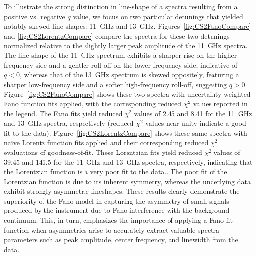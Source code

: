 To illustrate the strong distinction in line-shape of a spectra resulting from a positive vs. negative \(q\) value, we focus on two particular detunings that yielded notably skewed line shapes: \SI{11}{\giga\hertz} and \SI{13}{\giga\hertz}. Figures~\ref{fig:CS2FanoCompare} and \ref{fig:CS2LorentzCompare} compare the spectra for these two detunings normalized relative to the slightly larger peak amplitude of the \SI{11}{\giga\hertz} spectra. The line-shape of the \SI{11}{\giga\hertz} spectrum exhibits a sharper rise on the higher-frequency side and a gentler roll-off on the lower-frequency side, indicative of \(q<0\), whereas that of the \SI{13}{\giga\hertz} spectrum is skewed oppositely, featuring a sharper low-frequency side and a softer high-frequency roll-off, suggesting \(q>0\). Figure~\ref{fig:CS2FanoCompare} shows these two spectra with uncertainty-weighted Fano function fits applied, with the corresponding reduced \(\chi^{2}\) values reported in the legend. The Fano fits yield reduced \(\chi^{2}\) values of 2.45 and 8.41 for the \SI{11}{\giga\hertz} and \SI{13}{\giga\hertz} spectra, respectively (reduced \(\chi^{2}\) values near unity indicate a good fit to the data). Figure~\ref{fig:CS2LorentzCompare} shows these same spectra with naïve Lorentz function fits applied and their corresponding reduced \(\chi^{2}\) evaluations of goodness-of-fit. These Lorentzian fits yield reduced \(\chi^{2}\) values of 39.45 and 146.5 for the \SI{11}{\giga\hertz} and \SI{13}{\giga\hertz} spectra, respectively, indicating that the Lorentzian function is a very poor fit to the data.. The poor fit of the Lorentzian function is due to its inherent symmetry, whereas the underlying data exhibit strongly asymmetric lineshapes. These results clearly demonstrate the superiority of the Fano model in capturing the asymmetry of small signals produced by the instrument due to Fano interference with the background continuum. This, in turn, emphasizes the importance of applying a Fano fit function when asymmetries arise to accurately extract valuable spectra parameters such as peak amplitude, center frequency, and linewidth from the data.


